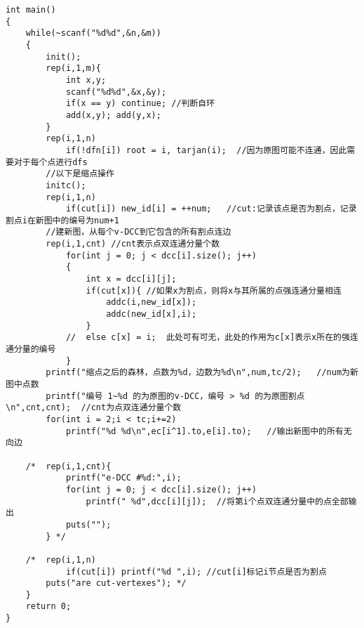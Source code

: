 \documentclass[twoside]{article}
\begin{document}
\begin{lstlisting}
int main()
{
	while(~scanf("%d%d",&n,&m))
	{
		init();
		rep(i,1,m){
			int x,y;
			scanf("%d%d",&x,&y);
			if(x == y) continue; //判断自环
			add(x,y); add(y,x);
		}
		rep(i,1,n)
			if(!dfn[i]) root = i, tarjan(i);  //因为原图可能不连通，因此需要对于每个点进行dfs
		//以下是缩点操作
		initc();
		rep(i,1,n)
			if(cut[i]) new_id[i] = ++num;	//cut:记录该点是否为割点，记录割点i在新图中的编号为num+1
		//建新图，从每个v-DCC到它包含的所有割点连边
		rep(i,1,cnt) //cnt表示点双连通分量个数
			for(int j = 0; j < dcc[i].size(); j++)
			{
				int x = dcc[i][j];
				if(cut[x]){	//如果x为割点，则将x与其所属的点强连通分量相连
					addc(i,new_id[x]);
					addc(new_id[x],i);
				}
			//	else c[x] = i;	此处可有可无，此处的作用为c[x]表示x所在的强连通分量的编号
			}
		printf("缩点之后的森林，点数为%d，边数为%d\n",num,tc/2);	//num为新图中点数
		printf("编号 1~%d 的为原图的v-DCC，编号 > %d 的为原图割点\n",cnt,cnt);	//cnt为点双连通分量个数
		for(int i = 2;i < tc;i+=2)
			printf("%d %d\n",ec[i^1].to,e[i].to);	//输出新图中的所有无向边

	/*	rep(i,1,cnt){
			printf("e-DCC #%d:",i);
			for(int j = 0; j < dcc[i].size(); j++)
				printf(" %d",dcc[i][j]);  //将第i个点双连通分量中的点全部输出
			puts("");
		} */		

	/*	rep(i,1,n)
			if(cut[i]) printf("%d ",i);	//cut[i]标记i节点是否为割点
		puts("are cut-vertexes"); */
	}
	return 0;
}\end{lstlisting}
\end{document}

